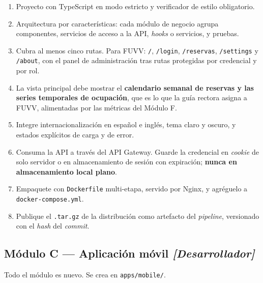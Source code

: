 \documentclass[11pt,a4paper]{article}
\begin{document}
\begin{enumerate}[leftmargin=*,itemsep=3pt]
	\item Proyecto con TypeScript en modo estricto y verificador de estilo obligatorio.
	\item Arquitectura por características: cada módulo de negocio agrupa componentes, servicios de acceso a la API, \emph{hooks} o servicios, y pruebas.
	\item Cubra al menos cinco rutas. Para FUVV: \texttt{/}, \texttt{/login}, \texttt{/reservas}, \texttt{/settings} y \texttt{/about}, con el panel de administración tras rutas protegidas por credencial y por rol.
	\item La vista principal debe mostrar el \textbf{calendario semanal de reservas y las series temporales de ocupación}, que es lo que la guía rectora asigna a FUVV, alimentadas por las métricas del Módulo F.
	\item Integre internacionalización en español e inglés, tema claro y oscuro, y estados explícitos de carga y de error.
	\item Consuma la API a través del API Gateway. Guarde la credencial en \emph{cookie} de solo servidor o en almacenamiento de sesión con expiración; \textbf{nunca en almacenamiento local plano}.
	\item Empaquete con \texttt{Dockerfile} multi-etapa, servido por Nginx, y agréguelo a \texttt{docker-compose.yml}.
	\item Publique el \texttt{.tar.gz} de la distribución como artefacto del \emph{pipeline}, versionado con el \emph{hash} del \emph{commit}.
\end{enumerate}

\subsection{Módulo C --- Aplicación móvil \emph{[Desarrollador]}}

Todo el módulo es nuevo. Se crea en \texttt{apps/mobile/}.
\end{document}
